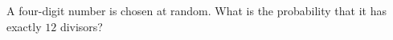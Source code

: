A four-digit number is chosen at random. What is the probability that it has exactly $12$ divisors?
